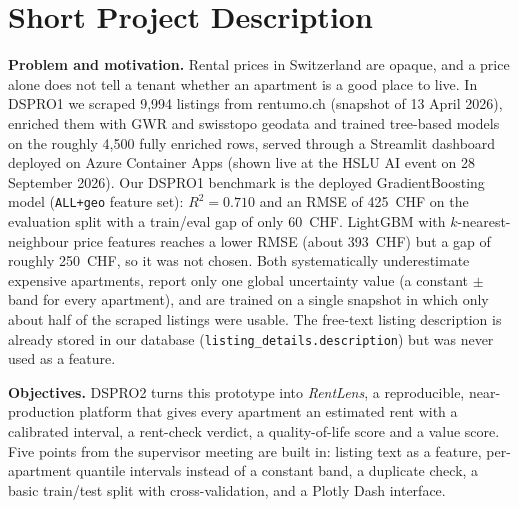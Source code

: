 \documentclass[11pt,a4paper]{article}
\begin{document}
\section{Short Project Description}

\textbf{Problem and motivation.} Rental prices in Switzerland are opaque, and a price alone does not tell a tenant whether an apartment is a good place to live. In DSPRO1 we scraped 9{,}994 listings from rentumo.ch (snapshot of 13 April 2026), enriched them with GWR and swisstopo geodata and trained tree-based models on the roughly 4{,}500 fully enriched rows, served through a Streamlit dashboard deployed on Azure Container Apps (shown live at the HSLU AI event on 28 September 2026). Our DSPRO1 benchmark is the deployed GradientBoosting model (\texttt{ALL+geo} feature set): $R^2 = 0.710$ and an RMSE of 425~CHF on the evaluation split with a train/eval gap of only 60~CHF. LightGBM with $k$-nearest-neighbour price features reaches a lower RMSE (about 393~CHF) but a gap of roughly 250~CHF, so it was not chosen. Both systematically underestimate expensive apartments, report only one global uncertainty value (a constant $\pm$ band for every apartment), and are trained on a single snapshot in which only about half of the scraped listings were usable. The free-text listing description is already stored in our database (\texttt{listing\_details.description}) but was never used as a feature.

\textbf{Objectives.} DSPRO2 turns this prototype into \emph{RentLens}, a reproducible, near-production platform that gives every apartment an estimated rent with a calibrated interval, a rent-check verdict, a quality-of-life score and a value score. Five points from the supervisor meeting are built in: listing text as a feature, per-apartment quantile intervals instead of a constant band, a duplicate check, a basic train/test split with cross-validation, and a Plotly Dash interface.
\end{document}
